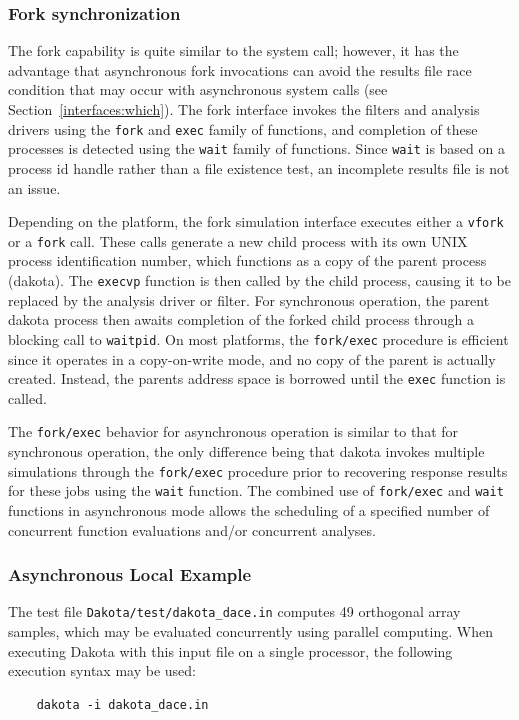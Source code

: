 \subsubsection{Fork synchronization}\label{parallel:SLP:local:fork}

The fork capability is quite similar to the system call; however, it
has the advantage that asynchronous fork invocations can avoid the
results file race condition that may occur with asynchronous system
calls (see Section~\ref{interfaces:which}). The fork interface invokes
the filters and analysis drivers using the \texttt{fork} and
\texttt{exec} family of functions, and completion of these processes
is detected using the \texttt{wait} family of functions. Since
\texttt{wait} is based on a process id handle rather than a file
existence test, an incomplete results file is not an issue.

Depending on the platform, the fork simulation interface executes
either a \texttt{vfork} or a \texttt{fork} call. These calls generate
a new child process with its own UNIX process identification number,
which functions as a copy of the parent process (dakota). The
\texttt{execvp} function is then called by the child process, causing
it to be replaced by the analysis driver or filter. For synchronous
operation, the parent dakota process then awaits completion of the
forked child process through a blocking call to \texttt{waitpid}. On
most platforms, the \texttt{fork/exec} procedure is efficient since it
operates in a copy-on-write mode, and no copy of the parent is
actually created. Instead, the parents address space is borrowed until
the \texttt{exec} function is called.

The \texttt{fork/exec} behavior for asynchronous operation is similar
to that for synchronous operation, the only difference being that
dakota invokes multiple simulations through the \texttt{fork/exec}
procedure prior to recovering response results for these jobs using
the \texttt{wait} function. The combined use of \texttt{fork/exec} and
\texttt{wait} functions in asynchronous mode allows the scheduling of
a specified number of concurrent function evaluations and/or
concurrent analyses.

\subsubsection{Asynchronous Local Example}\label{parallel:SLP:local:ex}

The test file \texttt{Dakota/test/dakota\_dace.in} computes 49
orthogonal array samples, which may be evaluated concurrently using
parallel computing.  When executing Dakota with this input file on a
single processor, the following execution syntax may be used:
\begin{small}
\begin{verbatim}
    dakota -i dakota_dace.in
\end{verbatim}
\end{small}


